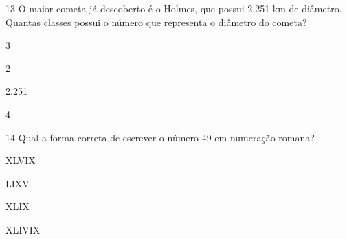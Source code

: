 




\num{13} O maior cometa já descoberto é o Holmes, que possui 2.251 km de
diâmetro. Quantas classes possui o número que representa o diâmetro do
cometa?
\item 3
\item 2
\item 2.251
\item 4






\num{14} Qual a forma correta de escrever o número 49 em numeração romana?
\item XLVIX
\item LIXV
\item XLIX
\item XLIVIX



